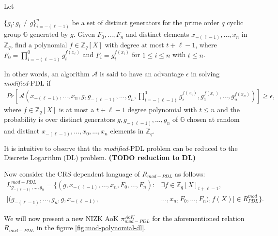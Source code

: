\begin{definition}
  Let\par 
  $\{g_i : g_i\neq g\}_{i=-(\ell-1)}^n$ be a set of distinct generators for the prime order $q$ cyclic 
  group $\mathbb{G}$ generated by $g$. Given $F_0,\dots,F_n$ and distinct elements $x_{-(\ell-1)},\dots,x_n$ in 
  $\mathbb{Z}_q$, find a polynomial $f\in\mathbb{Z}_q[X]$ with degree at most $t+\ell-1$, where $F_0=\prod_{i=-(\ell-1)}^{0}g_i^{f(x_i)}$ and
  $F_i=g_i^{f(x_i)}$ for $1\leq i\leq n$ with $t\leq n$.\par

  In other words, an algorithm $\mathcal{A}$ is said to have an advantage $\epsilon$ in solving \textit{modified}-PDL if 
  \begin{align*}
    Pr[\mathcal{A}(x_{-(\ell-1)},\dots,x_n,g,g_{-(\ell-1)},\dots,g_n,\prod_{i=-(\ell-1)}^{0}g_i^{f(x_i)},g_1^{f(x_1)},\dots,g_n^{f(x_n)})]\geq\epsilon,
  \end{align*}
  where $f\in\mathbb{Z}_q[X]$ is at most a $t+\ell-1$ degree polynomial with $t\leq n$ and the probability is over 
  distinct generators $g,g_{-(\ell-1)},\dots,g_n$ of $\mathbb{G}$ chosen at random and distinct $x_{-(\ell-1)},\dots,x_0,\dots,x_n$ 
  elements in $\mathbb{Z}_q$.
\end{definition}

It is intuitive to observe that the \textit{modified}-PDL problem can be reduced to the 
Discrete Logarithm (DL) problem. \textbf{(TODO reduction to DL)}\par

Now consider the CRS dependent language of $R_{mod-PDL}$ as follows:
\begin{align*}
  L_{g_{-(\ell-1)},\dots,g_n}^{mod-PDL} = \{(g,x_{-(\ell-1)},\dots,x_n,F_0,\dots,F_n) : &\exists f\in\mathbb{Z}_q[X]_{t+\ell-1},\\ 
  [(g_{-(\ell-1)},\dots,g_n,g,x_{-(\ell-1)},&\dots,x_n,F_0,\dots,F_n),f(X)]\in R_{PDL}^{mod}\}.
\end{align*}

We will now present a new NIZK AoK $\pi_{mod-PDL}^{AoK}$ for the aforementioned relation 
$R_{mod-PDL}$ in the figure \ref{fig:mod-polynomial-dl}.




